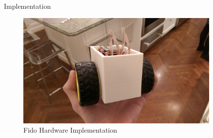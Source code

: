 \documentclass[final]{beamer}
\newlength{\sepwid}
\newlength{\onecolwid}
\newlength{\twocolwid}
\begin{document}
\begin{frame}[t]
\begin{columns}[t]
\begin{column}{\onecolwid}
\begin{block}{Implementation}
		\begin{figure}
			\centering
			\includegraphics[width=.77\linewidth]{Figures/Prototype.jpg}
			\caption{Fido Hardware Implementation}
		\end{figure}
	\end{block}


\end{column}

\begin{column}{\sepwid}\end{column} 

\begin{column}{\twocolwid}


\end{column}
\end{columns}
\end{frame}
\end{document}
